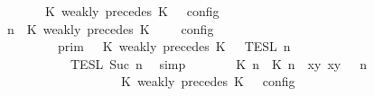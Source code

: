 \begin{isabellebody}
\ \ \ \ \ \ {\isasymturnstile}\ {\isasymPsi}\ {\isasymtriangleright}\ {\isacharparenleft}{\isacharparenleft}K\ weakly\ precedes\ K\ {\isacharhash}\ {\isasymPhi}{\isacharparenright}\ {\isasymrbrakk}\isactrlsub c\isactrlsub o\isactrlsub n\isactrlsub f\isactrlsub i\isactrlsub g{\isacartoucheclose}\isanewline
%
\isadelimproof
%
\endisadelimproof
%
\isatagproof
{}\isamarkupfalse%
\ {\isacharminus}\isanewline
\ \ \isamarkupfalse%
\ {\isacartoucheopen}{\isasymlbrakk}\ {\isasymGamma}{\isacharcomma}\ n\ {\isasymturnstile}\ {\isacharparenleft}K\ weakly\ precedes\ K\ {\isacharhash}\ {\isasymPsi}\ {\isasymtriangleright}\ {\isasymPhi}\ {\isasymrbrakk}\isactrlsub c\isactrlsub o\isactrlsub n\isactrlsub f\isactrlsub i\isactrlsub g\isanewline
\ \ \ \ \ \ \ \ {\isacharequal}\ {\isasymlbrakk}{\isasymlbrakk}\ {\isasymGamma}\ {\isasymrbrakk}{\isasymrbrakk}\isactrlsub p\isactrlsub r\isactrlsub i\isactrlsub m\ {\isasyminter}\ {\isasymlbrakk}{\isasymlbrakk}\ {\isacharparenleft}K\ weakly\ precedes\ K\ {\isacharhash}\ {\isasymPsi}\ {\isasymrbrakk}{\isasymrbrakk}\isactrlsub T\isactrlsub E\isactrlsub S\isactrlsub L\isactrlbsup {\isasymge}\ n\isactrlesup \isanewline
\ \ \ \ \ \ \ \ \ \ {\isasyminter}\ {\isasymlbrakk}{\isasymlbrakk}\ {\isasymPhi}\ {\isasymrbrakk}{\isasymrbrakk}\isactrlsub T\isactrlsub E\isactrlsub S\isactrlsub L\isactrlbsup {\isasymge}\ Suc\ n\isactrlesup {\isacartoucheclose}\ \isamarkupfalse%
\ simp\isanewline
\ \ \isamarkupfalse%
\ \isamarkupfalse%
\ {\isacartoucheopen}{\isasymlbrakk}\ {\isacharparenleft}{\isacharparenleft}{\isasymlceil}{\isacharhash}\isactrlsup {\isasymle}\ K\ n{\isacharcomma}\ {\isacharhash}\isactrlsup {\isasymle}\ K\ n{\isasymrceil}\ {\isasymin}\ {\isacharparenleft}{\isasymlambda}{\isacharparenleft}x{\isacharcomma}y{\isacharparenright}{\isachardot}\ x{\isasymle}y{\isacharparenright}{\isacharparenright}\ {\isacharhash}\ {\isasymGamma}{\isacharparenright}{\isacharcomma}\ n\isanewline
\ \ \ \ \ \ \ \ \ \ \ \ \ \ \ \ \ \ {\isasymturnstile}\ {\isasymPsi}\ {\isasymtriangleright}\ {\isacharparenleft}{\isacharparenleft}K\ weakly\ precedes\ K\ {\isacharhash}\ {\isasymPhi}{\isacharparenright}\ {\isasymrbrakk}\isactrlsub c\isactrlsub o\isactrlsub n\isactrlsub f\isactrlsub i\isactrlsub g\isanewline

\end{isabellebody}
